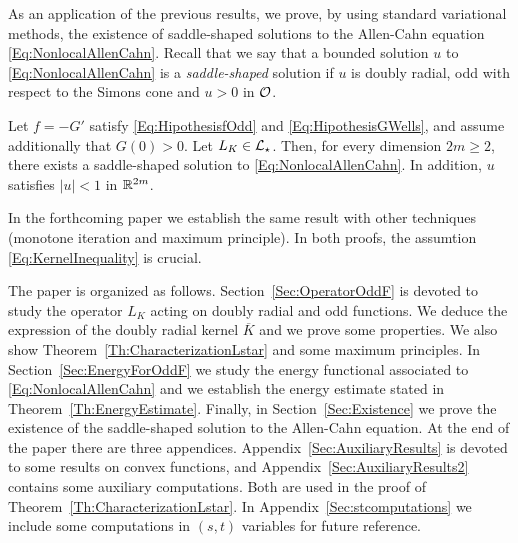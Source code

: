 As an application of the previous results, we prove, by using standard variational methods, the existence of saddle-shaped solutions to the Allen-Cahn equation \eqref{Eq:NonlocalAllenCahn}. Recall that we say that a bounded solution $u$ to \eqref{Eq:NonlocalAllenCahn} is a \emph{saddle-shaped} solution if $u$ is doubly radial, odd with respect to the Simons cone and $u>0$ in $\mathcal{O}$. 

\begin{theorem}
	\label{Th:Existence}
    Let $f=-G'$ satisfy \eqref{Eq:HipothesisfOdd} and \eqref{Eq:HipothesisGWells}, and assume additionally that $G(0)>0$. Let $L_K\in \mathcal{L}_\star$. Then, for every dimension $2m \geq 2$, there exists a saddle-shaped solution to \eqref{Eq:NonlocalAllenCahn}. In addition, $u$ satisfies $|u|<1$ in $\mathbb{R}^{2m}$.
\end{theorem}

In the forthcoming paper \cite{FelipeSanz-Perela:IntegroDifferentialII} we establish the same result with other techniques (monotone iteration and maximum principle). In both proofs, the assumtion \eqref{Eq:KernelInequality} is crucial.


 The paper is organized as follows. Section~\ref{Sec:OperatorOddF} is devoted to study the operator $L_K$ acting on doubly radial and odd functions. We deduce the expression of the doubly radial kernel $\overline{K}$ and we prove some properties. We also show Theorem~\ref{Th:CharacterizationLstar} and some maximum principles. In Section~\ref{Sec:EnergyForOddF} we study the energy functional associated to \eqref{Eq:NonlocalAllenCahn} and we establish the energy estimate stated in Theorem~\ref{Th:EnergyEstimate}. Finally, in Section~\ref{Sec:Existence} we prove the existence of the saddle-shaped solution to the Allen-Cahn equation. At the end of the paper there are three appendices. Appendix~\ref{Sec:AuxiliaryResults} is devoted to some results on convex functions, and Appendix~\ref{Sec:AuxiliaryResults2} contains some auxiliary computations. Both are used in the proof of Theorem~\ref{Th:CharacterizationLstar}. In Appendix~\ref{Sec:stcomputations} we include some computations in $(s,t)$ variables for future reference.